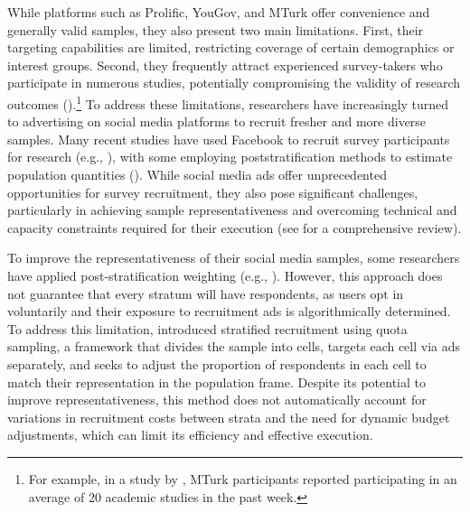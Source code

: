 \documentclass[letterpaper,12pt]{article}
\theoremstyle{proposition}
\begin{document}
While platforms such as Prolific, YouGov, and MTurk offer convenience and generally valid samples, they also present two main limitations. First, their targeting capabilities are limited, restricting coverage of certain demographics or interest groups. Second, they frequently attract experienced survey-takers who participate in numerous studies, potentially compromising the validity of research outcomes (\citealt{krefeld2024exposing}).\footnote{For example, in a study by \citet{rand2014social}, MTurk participants reported participating in an average of 20 academic studies in the past week.}  To address these limitations, researchers have increasingly turned to advertising on social media platforms to recruit fresher and more diverse samples. Many recent studies have used Facebook to recruit survey participants for research (e.g., \citealt{allcott2020welfare,donati2024can,sances2018ideology}), with some employing poststratification methods to estimate population quantities (\citealt{Zagheni2017,Perrotta2020}). 
While social media ads  offer unprecedented opportunities for survey recruitment, they also pose significant challenges, particularly in achieving sample representativeness and overcoming technical and capacity constraints required for their execution (see \citealt{aridor2024experiments} for a comprehensive review).








To improve the representativeness of their social media samples, some researchers have applied post-stratification weighting (e.g., \citealt{boas2020recruiting}). However, this approach does not guarantee that every stratum will have respondents, as users opt in voluntarily and their exposure to recruitment ads is algorithmically determined. To address this limitation, \citet{zhang2020quota} introduced stratified recruitment using quota sampling, a framework that divides the sample into cells, targets each cell via ads separately, and seeks to adjust the proportion of respondents in each cell to match their representation in the population frame. Despite its potential to improve representativeness, this method does not automatically account for variations in recruitment costs between strata and the need for dynamic budget adjustments, which can limit its efficiency and effective execution.
\end{document}
